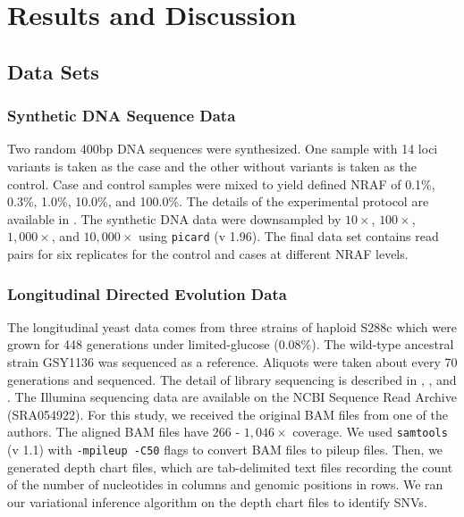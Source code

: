 \documentclass{bmcart}
\begin{document}
\section{Results and Discussion}

\subsection{Data Sets}

\subsubsection{Synthetic DNA Sequence Data}

Two random 400bp DNA sequences were synthesized. One sample with 14 loci variants is taken as the case and the other without variants is taken as the control.
Case and control samples were mixed to yield defined NRAF of 0.1\%, 0.3\%, 1.0\%, 10.0\%, and 100.0\%.
The details of the experimental protocol are available in \cite{flaherty2011ultrasensitive}.
The synthetic DNA data were downsampled by $10\times$, $100\times$, $1,000\times$, and $10,000\times$ using \texttt{picard} (v 1.96).
The final data set contains read pairs for six replicates for the control and cases at different NRAF levels.

\subsubsection{Longitudinal Directed Evolution Data}

The longitudinal yeast data comes from three strains of haploid S288c which were grown for 448 generations under limited-glucose (0.08\%).
The wild-type ancestral strain GSY1136 was sequenced as a reference.
Aliquots were taken about every 70 generations and sequenced.
The detail of library sequencing is described in \cite{kvitek2013whole}, \cite{bansal2010statistical}, and \cite{kao2008molecular}.
The Illumina sequencing data are available on the NCBI Sequence Read Archive (SRA054922)\cite{kvitek2013whole}.
For this study, we received the original BAM files from one of the authors.
The aligned BAM files have $266$ - $1,046\times$ coverage.
We used \texttt{samtools} (v 1.1) with \texttt{-mpileup -C50} flags to convert BAM files to pileup files.
Then, we generated depth chart files, which are tab-delimited text files recording the count of the number of nucleotides in columns and genomic positions in rows.
We ran our variational inference algorithm on the depth chart files to identify SNVs.
\end{document}
